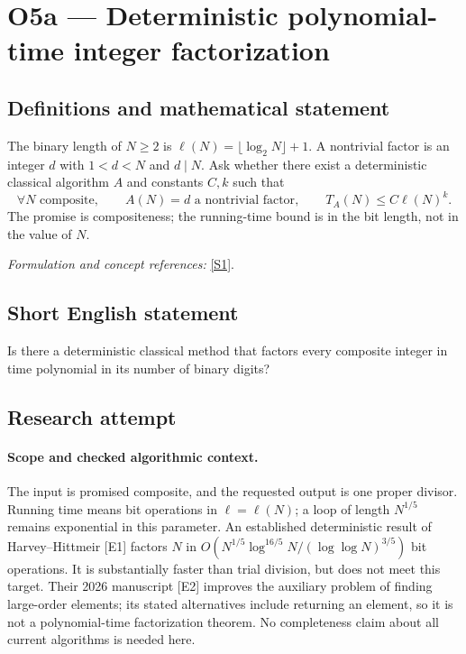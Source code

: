 \documentclass[11pt]{article}
\begin{document}
\section*{\texorpdfstring{O5a — Deterministic polynomial-time integer factorization}{O5a — Deterministic polynomial-time integer factorization}}\label{8400004}
\subsection{Definitions and mathematical statement}
The binary length of $N\ge2$ is $\ell(N)=\lfloor\log_2N\rfloor+1$. A nontrivial factor is an integer $d$ with $1<d<N$ and $d\mid N$. Ask whether there exist a deterministic classical algorithm $A$ and constants $C,k$ such that
\[
 \forall N\text{ composite},\qquad A(N)=d\text{ a nontrivial factor},\qquad
 T_A(N)\le C\ell(N)^k.
\]
The promise is compositeness; the running-time bound is in the bit length, not in the value of $N$.
\par\smallskip\textit{Formulation and concept references:} \href{https://www.sciencedirect.com/science/article/pii/S0022000015000768}{[S1]}.

\subsection{Short English statement}
Is there a deterministic classical method that factors every composite integer in time polynomial in its number of binary digits?
\subsection{Research attempt}

\paragraph{Scope and checked algorithmic context.}
The input is promised composite, and the requested output is one proper
divisor. Running time means bit operations in $\ell=\ell(N)$; a loop of
length $N^{1/5}$ remains exponential in this parameter. An established
deterministic result of Harvey--Hittmeir [E1] factors $N$ in
$O(N^{1/5}\log^{16/5}N/(\log\log N)^{3/5})$ bit operations. It is
substantially faster than trial division, but does not meet this target.
Their 2026 manuscript [E2] improves the auxiliary problem of finding
large-order elements; its stated alternatives include returning an element,
so it is not a polynomial-time factorization theorem. No completeness
claim about all current algorithms is needed here.
\end{document}
